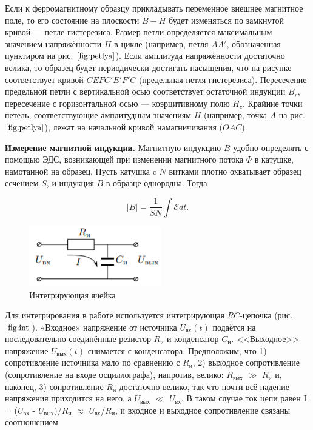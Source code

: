 \documentclass[12pt,a4paper]{article}
\begin{document}
Если к ферромагнитному образцу прикладывать переменное внешнее
магнитное поле, то его состояние на плоскости $ B-H $ будет изменяться
по замкнутой кривой — петле гистерезиса. Размер петли определяется
максимальным значением напряжённости $ H $ в цикле (например, петля $ AA' $,
обозначенная пунктиром на рис. $\ref{fig:petlya}$). Если амплитуда напряжённости достаточно велика, то образец будет периодически достигать насыщения,
что на рисунке соответствует кривой $ CEFC'E'F'C $ (предельная петля
гистерезиса). Пересечение предельной петли с вертикальной осью соответствует остаточной индукции $B_r$, пересечение с горизонтальной осью
— коэрцитивному полю $H_c$. Крайние точки петель, соответствующие амплитудным значениям $ H $ (например, точка $ A $ на рис. $\ref{fig:petlya}$), лежат на начальной кривой намагничивания ($ OAC $).

\textbf{Измерение магнитной индукции.} Магнитную индукцию $ B $ удобно
определять с помощью ЭДС, возникающей при изменении магнитного
потока $ \Phi $ в катушке, намотанной на образец. Пусть катушка c $ N $ витками плотно охватывает образец сечением $ S $, и индукция $ B $ в образце
однородна. Тогда

\begin{equation}
|B|=\frac{1}{SN}\int\mathcal{E} dt.
\label{eq:|B|}
\end{equation}

\begin{figure}
	\includegraphics[width=\linewidth]{res/int.png}
	\caption{Интегрирующая ячейка}
	\label{fig:int}
\end{figure}

Для интегрирования в работе используется интегрирующая $ RC $-цепочка (рис. $ \ref{fig:int} $).
«Входное» напряжение от источника $U_{\text{вх}}(t)$ подаётся на последовательно соединённые резистор $R_\text{и}$ и конденсатор $C_\text{и}$. <<Выходное>>
напряжение $U_{\text{вых}}(t)$ снимается с конденсатора. Предположим, что 1) сопротивление источника мало по сравнению с $R_\text{и}$, 2) выходное сопротивление (сопротивление на входе осциллографа), напротив, велико: $R_{\text{вых}}$ $ \gg $ $R_\text{и}$ и, наконец, 3) сопротивление $R_\text{и}$ достаточно велико, так что почти всё падение напряжения приходится на него, а $U_{\text{вых}}$ $\ll$ $U_{\text{вх}}$. В таком случае ток цепи равен I = ($U_{\text{вх}}$ - $U_{\text{вых}}$)/$R_\text{и}$ $\approx$ $U_{\text{вх}}$/$R_\text{и}$, и входное и выходное сопротивление связаны соотношением
\end{document}
